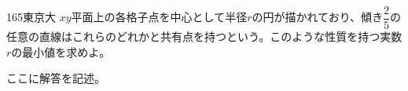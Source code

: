 \begin{prob}{165}{\maru}{東京大}
 $xy$平面上の各格子点を中心として半径$r$の円が描かれており、傾き$\dfrac{2}{5}$の任意の直線はこれらのどれかと共有点を持つという。このような性質を持つ実数$r$の最小値を求めよ。
\end{prob}
ここに解答を記述。